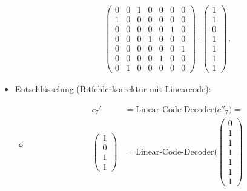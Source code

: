 \begin{itemize}
\begin{itemize}
\begin{align*}
            \begin{pmatrix} %
                0 & 0 & 1 & 0 & 0 & 0 & 0\\
                1 & 0 & 0 & 0 & 0 & 0 & 0\\
                0 & 0 & 0 & 0 & 0 & 1 & 0\\
                0 & 0 & 0 & 1 & 0 & 0 & 0\\
                0 & 0 & 0 & 0 & 0 & 0 & 1\\
                0 & 0 & 0 & 0 & 1 & 0 & 0\\
                0 & 1 & 0 & 0 & 0 & 0 & 0
            \end{pmatrix}
            \cdot
            \begin{pmatrix} %
                1\\
                1\\
                0\\
                1\\
                1\\
                1\\
                1
            \end{pmatrix}
            \,.
        \end{align*}
    \end{itemize}
    \item Entschlüsselung (Bitfehlerkorrektur mit Linearcode):
    \begin{itemize}
        \item[]
        \begin{align*}
            c_{7}'\,&=\text{Linear-Code-Decoder($c''_7$)}=\\
            \begin{pmatrix} %
                1\\
                0\\
                1\\
                1
            \end{pmatrix}
            &=\text{Linear-Code-Decoder(}
            \begin{pmatrix}
                0\\
                1\\
                1\\
                1\\
                1\\
                1\\
                1
            \end{pmatrix}

\end{align*}
\end{itemize}
\end{itemize}
